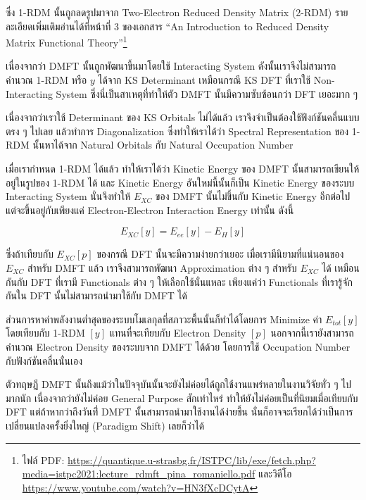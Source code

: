 ซึ่ง 1-RDM นั้นถูกลดรูปมาจาก Two-Electron Reduced Density Matrix (2-RDM) รายละเอียดเพิ่มเติมอ่านได้ที่หน้าที่ 3 ของเอกสาร
\enquote{An Introduction to Reduced Density Matrix Functional Theory}\footnote{ไฟล์ PDF:
    \url{https://quantique.u-strasbg.fr/ISTPC/lib/exe/fetch.php?media=istpc2021:lecture_rdmft_pina_romaniello.pdf}
    และวิดีโอ \url{https://www.youtube.com/watch?v=HN3fXcDCytA}}

เนื่องจากว่า DMFT นั้นถูกพัฒนาขึ้นมาโดยใช้ Interacting System ดังนั้นเราจึงไม่สามารถคำนวณ 1-RDM หรือ $y$ ได้จาก KS Determinant
เหมือนกรณี KS DFT ที่เราใช้ Non-Interacting System ซึ่งนี่เป็นสาเหตุที่ทำให้ตัว DMFT นั้นมีความซับซ้อนกว่า DFT เยอะมาก ๆ

เนื่องจากว่าเราใช้ Determinant ของ KS Orbitals ไม่ได้แล้ว เราจึงจำเป็นต้องใช้ฟังก์ชันคลื่นแบบตรง ๆ ไปเลย แล้วทำการ Diagonalization
ซึ่งทำให้เราได้ว่า Spectral Representation ของ 1-RDM นั้นหาได้จาก Natural Orbitals กับ Natural Occupation Number

เมื่อเรากำหนด 1-RDM ได้แล้ว ทำให้เราได้ว่า Kinetic Energy ของ DMFT นั้นสามารถเขียนให้อยู่ในรูปของ 1-RDM ได้ และ Kinetic Energy
อันใหม่นี้นั้นก็เป็น Kinetic Energy ของระบบ Interacting System นั่นจึงทำให้ $E_{XC}$ ของ DMFT นั้นไม่ขึ้นกับ Kinetic Energy อีกต่อไป
แต่จะขึ้นอยู่กับเพียงแค่ Electron-Electron Interaction Energy เท่านั้น ดังนี้

\begin{equation}
    E_{XC}[y] = E_{ee}[y] - E_{H}[y]
\end{equation}

\noindent ซึ่งถ้าเทียบกับ $E_{XC}[p]$ ของกรณี DFT นั้นจะมีความง่ายกว่าเยอะ เมื่อเรามีนิยามที่แน่นอนของ $E_{XC}$ สำหรับ DMFT แล้ว
เราจึงสามารถพัฒนา Approximation ต่าง ๆ สำหรับ $E_{XC}$ ได้ เหมือนกันกับ DFT ที่เรามี Functionals ต่าง ๆ ให้เลือกใช้นั่นแหละ
เพียงแค่ว่า Functionals ที่เรารู้จักกันใน DFT นั้นไม่สามารถนำมาใช้กับ DMFT ได้

ส่วนการหาค่าพลังงานต่ำสุดของระบบโมเลกุลที่สภาวะพื้นนั้นก็ทำได้โดยการ Minimize ค่า $E_{tot}[y]$ โดยเทียบกับ 1-RDM $[y]$ แทนที่จะเทียบกับ
Electron Density $[p]$ นอกจากนี้เรายังสามารถคำนวณ Electron Density ของระบบจาก DMFT ได้ด้วย โดยการใช้ Occupation Number
กับฟังก์ชันคลื่นนั่นเอง

ตัวทฤษฎี DMFT นั้นถึงแม้ว่าในปัจจุบันนั้นจะยังไม่ค่อยได้ถูกใช้งานแพร่หลายในงานวิจัยทั่ว ๆ ไปมากนัก เนื่องจากว่ายังไม่ค่อย General Purpose
สักเท่าไหร่ ทำให้ยังไม่ค่อยเป็นที่นิยมเมื่อเทียบกับ DFT แต่ถ้าหากว่าถึงวันที่่ DMFT นั้นสามารถนำมาใช้งานได้ง่ายขึ้น นั่นก็อาจจะเรียกได้ว่าเป็นการ%
เปลี่ยนแปลงครั้งยิ่งใหญ่ (Paradigm Shift) เลยก็ว่าได้
